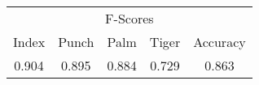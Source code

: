 \documentclass{standalone}
\begin{document}
 
 \begin{tabular}{|c|c|c|c ||c|}
\cline{1-5}\multicolumn{5}{|c|}{F-Scores} \\ 
\cline{1-5}Index & Punch & Palm & Tiger & Accuracy\\ 
\cline{1-5}0.904 & 0.895 & 0.884 & 0.729 & 0.863\\ 
 \cline{1-5}\hline \end{tabular}
 
\end{document}
